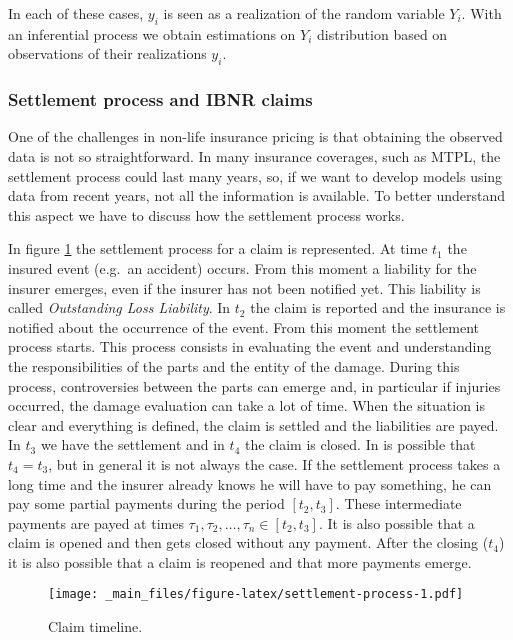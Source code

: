 \documentclass[a4paper, nobind]{templates/ociamthesis}
\theoremstyle{definition}
\theoremstyle{definition}
\theoremstyle{definition}
\theoremstyle{remark}
\begin{document}
In each of these cases, \(y_i\) is seen as a realization of the random variable \(Y_i\). With an inferential process we obtain estimations on \(Y_i\) distribution based on observations of their realizations \(y_i\).

\hypertarget{settlement-process-and-ibnr-claims}{%
\subsubsection{Settlement process and IBNR claims}\label{settlement-process-and-ibnr-claims}}

One of the challenges in non-life insurance pricing is that obtaining the observed data is not so straightforward. In many insurance coverages, such as MTPL, the settlement process could last many years, so, if we want to develop models using data from recent years, not all the information is available. To better understand this aspect we have to discuss how the settlement process works.

In figure \ref{fig:settlement-process} the settlement process for a claim is represented. At time \(t_1\) the insured event (e.g.~an accident) occurs. From this moment a liability for the insurer emerges, even if the insurer has not been notified yet. This liability is called \emph{Outstanding Loss Liability}. In \(t_2\) the claim is reported and the insurance is notified about the occurrence of the event. From this moment the settlement process starts. This process consists in evaluating the event and understanding the responsibilities of the parts and the entity of the damage. During this process, controversies between the parts can emerge and, in particular if injuries occurred, the damage evaluation can take a lot of time. When the situation is clear and everything is defined, the claim is settled and the liabilities are payed. In \(t_3\) we have the settlement and in \(t_4\) the claim is closed. In is possible that \(t_4=t_3\), but in general it is not always the case. If the settlement process takes a long time and the insurer already knows he will have to pay something, he can pay some partial payments during the period \([t_2, t_3]\). These intermediate payments are payed at times \(\tau_1, \tau_2, \dots, \tau_n \in [t_2, t_3]\). It is also possible that a claim is opened and then gets closed without any payment. After the closing (\(t_4\)) it is also possible that a claim is reopened and that more payments emerge.

\begin{figure}
\centering
\texttt{[image: \_main\_files/figure-latex/settlement-process-1.pdf]}
\caption{\label{fig:settlement-process}Claim timeline.}
\end{figure}
\end{document}
